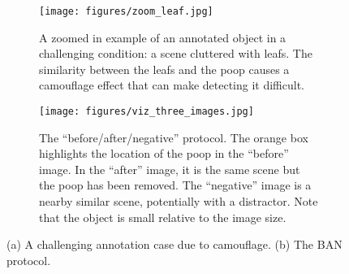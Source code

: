 \documentclass{article}
\begin{document}
\begin{figure}[t]
\centering
\begin{subfigure}[t]{0.49\textwidth}
    \centering
    \texttt{[image: figures/zoom\_leaf.jpg]}
    \caption[]{
        A zoomed in example of an annotated object in a challenging
        condition: a scene cluttered with leafs. The similarity between the leafs
        and the poop causes a camouflage effect that can make detecting it difficult.
    }
    \label{fig:HardCase}
\end{subfigure}
\hfill
\begin{subfigure}[t]{0.49\textwidth}
    \centering
    \texttt{[image: figures/viz\_three\_images.jpg]}
    \caption[]{
        The ``before/after/negative'' protocol.
        The orange box highlights the location of the poop 
        in the ``before'' image.
        In the ``after'' image, it is the same scene but the poop has been removed.
        The ``negative'' image is a nearby similar scene, potentially with a distractor.
        Note that the object is small relative to the image size.
    }
    \label{fig:ThreeImages}
\end{subfigure}
\caption{(a) A challenging annotation case due to camouflage. (b) The BAN protocol.}
\label{fig:Combined}
\end{figure}
  

\end{document}
